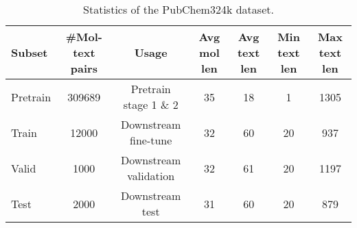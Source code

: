 \documentclass[11pt]{article}
\begin{document}
\begin{table*}[t]
\small
\centering
\begin{tabular}{lcccccc} \toprule
Subset & \#Mol-text pairs & Usage & Avg mol len & Avg text len & Min text len & Max text len \\\midrule
Pretrain & 309689 & Pretrain stage 1 \& 2 & 35 & 18 & 1 & 1305 \\
Train & 12000 & Downstream fine-tune & 32 & 60 & 20 & 937 \\
Valid & 1000 & Downstream validation & 32 & 61 & 20 & 1197 \\
Test & 2000 & Downstream test & 31 & 60 & 20 & 879 \\\bottomrule
\end{tabular}
\caption{Statistics of the PubChem324k dataset.}
\label{tab:PubChem324k_detail}
\end{table*}
\end{document}
